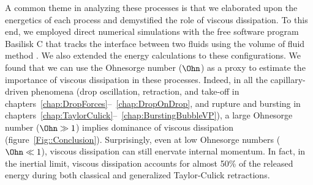A common theme in analyzing these processes is that we elaborated upon the energetics of each process and demystified the role of viscous dissipation. To this end, we employed direct numerical simulations with the free software program Basilisk C \citep{basiliskpopinet1} that tracks the interface between two fluids using the volume of fluid method \citep{prosperetti2009computational, tryggvason2011direct}. We also extended the energy calculations \citep{landau2013course, wildeman2016spreading, bohr2021surface} to these configurations. We found that we can use the Ohnesorge number ($\Ohn$) as a proxy to estimate the importance of viscous dissipation in these processes. Indeed, in all the capillary-driven phenomena (drop oscillation, retraction, and take-off in chapters~\ref{chap:DropForces}--~\ref{chap:DropOnDrop}, and rupture and bursting in chapters~\ref{chap:TaylorCulick}--~\ref{chap:BurstingBubbleVP}), a large Ohnesorge number ($\Ohn \gg 1$) implies dominance of viscous dissipation (figure~\ref{Fig::Conclusion}). Surprisingly, even at low Ohnesorge numbers ($\Ohn \ll 1$), viscous dissipation can still enervate internal momentum. In fact, in the inertial limit, viscous dissipation accounts for almost 50\% of the released energy during both classical and generalized Taylor-Culick retractions.

